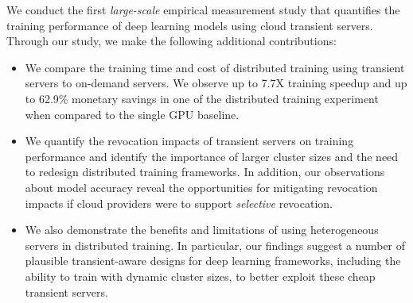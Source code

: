 %

We conduct the first \emph{large-scale} empirical measurement study that 
quantifies the training performance of deep learning models using cloud transient servers.  
Through our study, we make the following additional contributions: 
\begin{itemize}
\item We compare the training time and cost of distributed training using transient servers to on-demand servers. We observe up to 7.7X training speedup and up to 62.9\% monetary savings
in one of the distributed training experiment when compared to the single GPU baseline. 
\item We quantify the revocation impacts of transient servers on training performance and identify the importance of larger cluster sizes and the need to redesign distributed training frameworks. In addition, our observations about model accuracy reveal the opportunities for mitigating revocation impacts if cloud providers were to support \emph{selective} revocation. 
\item We also demonstrate the benefits and limitations of using heterogeneous servers in distributed training. In particular, our findings suggest a number of plausible transient-aware designs for deep learning frameworks, including the ability to train with dynamic cluster sizes, to better exploit these cheap transient servers. 
\end{itemize}


